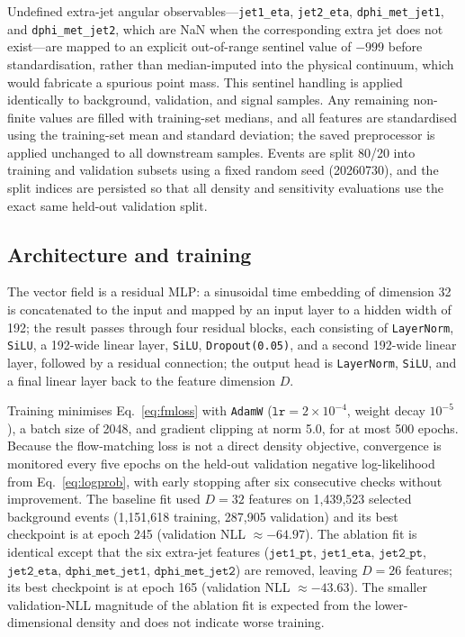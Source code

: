 \documentclass[11pt,a4paper,twocolumn]{article}
\begin{document}
Undefined extra-jet angular observables---\texttt{jet1\_eta},
\texttt{jet2\_eta}, \texttt{dphi\_met\_jet1}, and \texttt{dphi\_met\_jet2},
which are NaN when the corresponding extra jet does not exist---are mapped
to an explicit out-of-range sentinel value of $-999$ before
standardisation, rather than median-imputed into the physical continuum,
which would fabricate a spurious point mass. This sentinel handling is
applied identically to background, validation, and signal samples. Any
remaining non-finite values are filled with training-set medians, and all
features are standardised using the training-set mean and standard
deviation; the saved preprocessor is applied unchanged to all downstream
samples. Events are split 80/20 into training and validation subsets using
a fixed random seed (20260730), and the split indices are persisted so that
all density and sensitivity evaluations use the exact same held-out
validation split.

\subsection{Architecture and training}

The vector field is a residual MLP: a sinusoidal time embedding of
dimension 32 is concatenated to the input and mapped by an input layer to a
hidden width of 192; the result passes through four residual blocks, each
consisting of \texttt{LayerNorm}, \texttt{SiLU}, a 192-wide linear layer,
\texttt{SiLU}, \texttt{Dropout(0.05)}, and a second 192-wide linear layer,
followed by a residual connection; the output head is
\texttt{LayerNorm}, \texttt{SiLU}, and a final linear layer back to the
feature dimension $D$.

Training minimises Eq.~\eqref{eq:fmloss} with \texttt{AdamW}
($\texttt{lr}=2\times10^{-4}$, weight decay $10^{-5}$), a batch size of
2048, and gradient clipping at norm 5.0, for at most 500 epochs. Because the
flow-matching loss is not a direct density objective, convergence is
monitored every five epochs on the held-out validation negative
log-likelihood from Eq.~\eqref{eq:logprob}, with early stopping after six
consecutive checks without improvement. The baseline fit used
$D=32$ features on 1{,}439{,}523 selected background events (1{,}151{,}618
training, 287{,}905 validation) and its best checkpoint is at epoch 245
(validation NLL $\approx -64.97$). The ablation fit is identical except that
the six extra-jet features ($\texttt{jet1\_pt}$,
$\texttt{jet1\_eta}$, $\texttt{jet2\_pt}$, $\texttt{jet2\_eta}$,
$\texttt{dphi\_met\_jet1}$, $\texttt{dphi\_met\_jet2}$) are removed,
leaving $D=26$ features; its best checkpoint is at epoch 165 (validation NLL
$\approx -43.63$). The smaller validation-NLL magnitude of the ablation fit
is expected from the lower-dimensional density and does not indicate worse
training.
\end{document}
